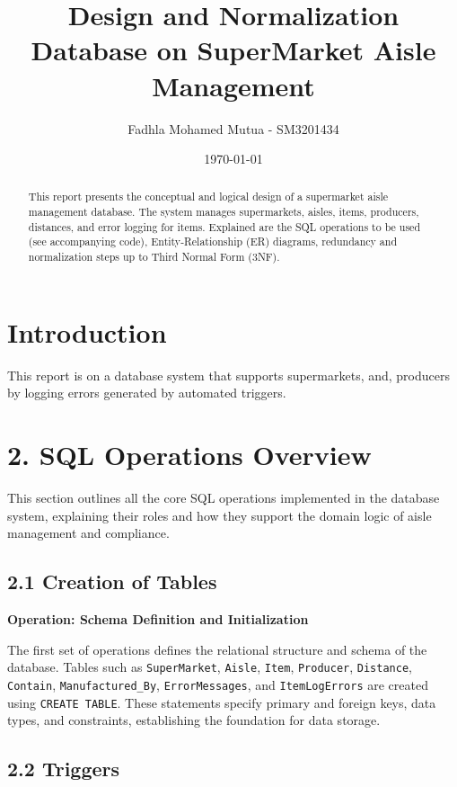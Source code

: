 \documentclass[a4paper,12pt]{article}
\title{Design and Normalization Database on SuperMarket Aisle Management}
\author{Fadhla Mohamed Mutua - SM3201434}
\date{\today}
\begin{document}
\maketitle

\begin{abstract}
This report presents the conceptual and logical design of a supermarket aisle management database. The system manages supermarkets, aisles, items, producers, distances, and error logging for items. Explained are the SQL operations to be used (see accompanying code), Entity-Relationship (ER) diagrams, redundancy and normalization steps up to Third Normal Form (3NF).
\end{abstract}

\newpage
\tableofcontents
\newpage

\section{Introduction}
This report is on a database system that supports supermarkets, and, producers by logging errors generated by automated triggers.

\section*{2. SQL Operations Overview}

This section outlines all the core SQL operations implemented in the database system, explaining their roles and how they support the domain logic of aisle management and compliance.

\subsection*{2.1 Creation of Tables}

\textbf{Operation: Schema Definition and Initialization}

The first set of operations defines the relational structure and schema of the database. Tables such as \texttt{SuperMarket}, \texttt{Aisle}, \texttt{Item}, \texttt{Producer}, \texttt{Distance}, \texttt{Contain}, \texttt{Manufactured\_By}, \texttt{ErrorMessages}, and \texttt{ItemLogErrors} are created using \texttt{CREATE TABLE}. These statements specify primary and foreign keys, data types, and constraints, establishing the foundation for data storage.

\subsection*{2.2 Triggers}
\end{document}

